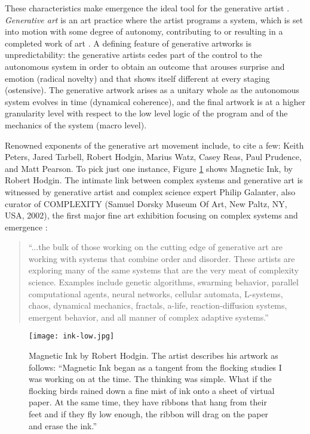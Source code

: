 \documentclass{article}
\begin{document}
These characteristics make emergence the ideal tool for the generative artist \cite{P11}. \textit{Generative art} is an art practice where the artist programs a system, which is set into motion with some degree of autonomy, contributing to or resulting in a completed work of art \cite{G03}. A defining feature of generative artworks is unpredictability: the generative artists cedes part of the control to the autonomous system in order to obtain an outcome that arouses surprise and emotion (radical novelty) and that shows itself different at every staging (ostensive). The generative artwork arises as a unitary whole as the autonomous system evolves in time (dynamical coherence), and the final artwork is at a higher granularity level with respect to the low level logic of the program and of the mechanics of the system (macro level). 

Renowned exponents of the generative art movement include, to cite a few: Keith Peters, Jared Tarbell, Robert Hodgin, Marius Watz, Casey Reas, Paul Prudence, and Matt Pearson. To pick just one instance, Figure \ref{ink} shows Magnetic Ink, by Robert Hodgin. The intimate link between complex systems and generative art is witnessed by generative artist and complex science expert Philip Galanter, also curator of COMPLEXITY (Samuel Dorsky Museum Of Art, New Paltz, NY, USA, 2002), the first major fine art exhibition focusing on complex systems and emergence \cite{G03}:


\begin{quote}
``...the bulk of those working on the cutting edge of generative art are working with systems that combine order and disorder. These artists are exploring many of the same systems that are the very meat of complexity science. Examples include genetic algorithms, swarming behavior, parallel computational agents, neural networks, cellular automata, L-systems, chaos, dynamical mechanics, fractals, a-life, reaction-diffusion systems, emergent behavior, and all manner of complex adaptive systems.'' 
\end{quote}

\begin{figure}[t]
\centering
\texttt{[image: ink-low.jpg]}
\caption{Magnetic Ink by Robert Hodgin. The artist describes his artwork as follows: ``Magnetic Ink began as a tangent from the flocking studies I was working on at the time. The thinking was simple. What if the flocking birds rained down a fine mist of ink onto a sheet of virtual paper. At the same time, they have ribbons that hang from their feet and if they fly low enough, the ribbon will drag on the paper and erase the ink.''  \cite{RH14}}
\label{ink}
\end{figure}
\end{document}
